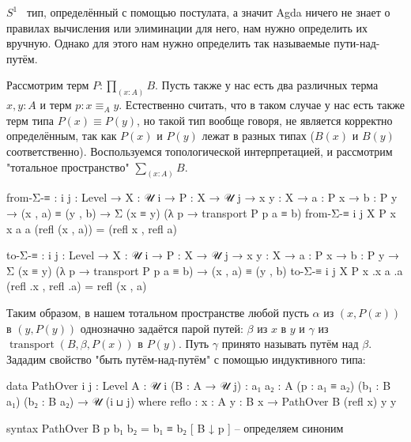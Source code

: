 \documentclass{article}[12pt]
\newcommand{\dash}{\textemdash\ }
\newcommand{\op}{\operatorname}
\begin{document}
$S^1$ \dash тип, определённый с помощью постулата, а значит Agda ничего не знает
о правилах вычисления или элиминации для него, нам нужно определить их вручную. Однако
для этого нам нужно определить так называемые пути-над-путём. 

Рассмотрим терм $P : \prod_{(x : A)} B$.
Пусть также у нас есть два различных терма $x, y : A$ и терм $p : x \equiv_{A} y$. 
Естественно считать, что в таком случае у нас есть также терм типа $P(x) \equiv P(y)$, но такой тип
вообще говоря, не является корректно определённым, так как $P(x)$ и $P(y)$ лежат в разных типах
($B(x)$ и $B(y)$ соответственно). Воспользуемся топологической интерпретацией, и рассмотрим
"тотальное пространство" \; $\sum_{(x : A)} B$. 
\begin{code}
from-Σ-≡ : {i j : Level} → {X : 𝒰 i} → {P : X → 𝒰 j}
           → {x y : X}
           → {a : P x} → {b : P y}
           → (x , a) ≡ (y , b)
           → Σ (x ≡ y) (λ p → transport P p a ≡ b)
from-Σ-≡ {i} {j} {X} {P} {x} {x} {a} {a} (refl (x , a)) = (refl x , refl a)

to-Σ-≡ : {i j : Level} → {X : 𝒰 i} → {P : X → 𝒰 j}
         → {x y : X}
         → {a : P x} → {b : P y}
         → Σ (x ≡ y) (λ p → transport P p a ≡ b)
         → (x , a) ≡ (y , b)
to-Σ-≡ {i} {j} {X} {P} {x} {.x} {a} {.a} (refl .x , refl .a) = refl (x , a)
\end{code}
Таким образом, в нашем тотальном пространстве любой пусть $\alpha$ из $(x, P(x))$ в $(y, P(y))$
однозначно задаётся парой путей: $\beta$ из $x$ в $y$ и $\gamma$ из $\op{transport}(B, \beta, P(x))$ в $P(y)$.
Путь $\gamma$ принято называть путём над $\beta$. Зададим свойство "быть путём-над-путём" \;
с помощью индуктивного типа:
\begin{code}
data PathOver {i j : Level} {A : 𝒰 i} (B : A → 𝒰 j) :
              {a₁ a₂ : A} (p : a₁ ≡ a₂)
              (b₁ : B a₁) (b₂ : B a₂) → 𝒰 (i ⊔ j) where
  reflo : {x : A} {y : B x} → PathOver B (refl x) y y

syntax PathOver B p b₁ b₂ = b₁ ≡ b₂ [ B ↓ p ] -- определяем синоним
\end{code}
\end{document}
